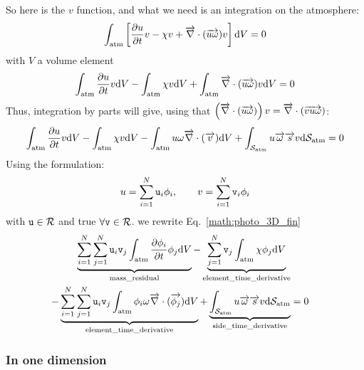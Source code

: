 So here is the $v$ function, and what we need is an integration on
the atmosphere:
\begin{equation}
\int_{\text{atm}}\left[\frac{\partial u}{\partial t}v - \chi v + \overrightarrow{\nabla}\cdot(\overrightarrow{u\omega}) v\right] \mathrm{d} V = 0
\label{math:solve:3D_photo}
\end{equation}
with $V$ a volume element
\begin{equation}
  \int_{\text{atm}}\frac{\partial u}{\partial t}v\mathrm{d} V 
- \int_{\text{atm}}\chi v \mathrm{d} V 
+ \int_{\text{atm}}\overrightarrow{\nabla}\cdot(\overrightarrow{u\omega})v \mathrm{d} V  = 0
\label{math:photo_3D_start}
\end{equation}
Thus, integration by parts will give,
using that $\left(\overrightarrow{\nabla}\cdot(\overrightarrow{u\omega})\right) v = \overrightarrow{\nabla}\cdot(\overrightarrow{vu\omega})$:
\begin{equation}
  \int_{\text{atm}}\frac{\partial u}{\partial t}v\mathrm{d} V
- \int_{\text{atm}}\chi v \mathrm{d} V 
- \int_{\text{atm}} u\omega \overrightarrow{\nabla}\cdot(\overrightarrow{v}) \mathrm{d} V 
+ \int_{\mathcal{S}_\text{atm}} u\overrightarrow{\omega}\overrightarrow{s}v {\mathrm{d}\mathcal{S}_\text{atm}} = 0
\label{math:photo_3D_fin}
\end{equation}
Using the formulation:
\begin{equation}
u = \sum_{i=1}^N \mathtt{u}_i \phi_i,\qquad v = \sum_{i=1}^N\mathtt{v}_i \phi_i
\end{equation}
with $\mathtt{u} \in \mathcal{R}$ and true $\forall \mathtt{v} \in \mathcal{R}$. 
we rewrite Eq.~\ref{math:photo_3D_fin}
\begin{equation}
\begin{split}
  \underbrace{\sum_{i=1}^N\sum_{j=1}^N\mathtt{u}_i\mathtt{v}_j\int_{\text{atm}}\frac{\partial\phi_i}{\partial t}\phi_j\mathrm{d} V}_{\text{mass\_residual}}
- \underbrace{\sum_{j=1}^N\mathtt{v}_j\int_{\text{atm}}\chi \phi_j \mathrm{d} V}_\text{element\_time\_derivative} \\
- \underbrace{\sum_{i=1}^N\sum_{j=1}^N\mathtt{u}_i\mathtt{v}_j\int_{\text{atm}} \phi_i\omega \overrightarrow{\nabla}\cdot(\overrightarrow{\phi_j}) \mathrm{d} V}_\text{element\_time\_derivative}
+ \underbrace{\int_{\mathcal{S}_\text{atm}} u\overrightarrow{\omega}\overrightarrow{s}v {\mathrm{d}\mathcal{S}_\text{atm}}}_\text{side\_time\_derivative} & = 0
\end{split}
\end{equation}

\subsubsection{In one dimension}

